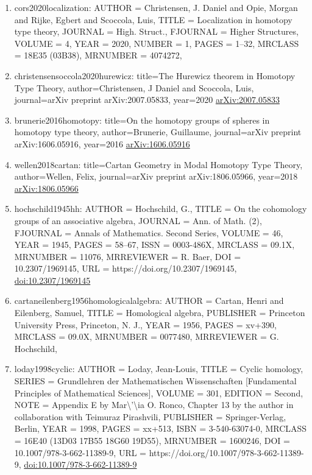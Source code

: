 \documentclass[11pt]{article}
\begin{document}
\begin{enumerate}[leftmargin=*]
  \item cors2020localization: AUTHOR = Christensen, J. Daniel and Opie, Morgan and Rijke, Egbert and Scoccola, Luis, TITLE = Localization in homotopy type theory, JOURNAL = High. Struct., FJOURNAL = Higher Structures, VOLUME = 4, YEAR = 2020, NUMBER = 1, PAGES = 1--32, MRCLASS = 18E35 (03B38), MRNUMBER = 4074272,
  \item christensensoccola2020hurewicz: title=The Hurewicz theorem in Homotopy Type Theory, author=Christensen, J Daniel and Scoccola, Luis, journal=arXiv preprint arXiv:2007.05833, year=2020 \href{https://arxiv.org/abs/2007.05833}{arXiv:2007.05833}
  \item brunerie2016homotopy: title=On the homotopy groups of spheres in homotopy type theory, author=Brunerie, Guillaume, journal=arXiv preprint arXiv:1606.05916, year=2016 \href{https://arxiv.org/abs/1606.05916}{arXiv:1606.05916}
  \item wellen2018cartan: title=Cartan Geometry in Modal Homotopy Type Theory, author=Wellen, Felix, journal=arXiv preprint arXiv:1806.05966, year=2018 \href{https://arxiv.org/abs/1806.05966}{arXiv:1806.05966}
  \item hochschild1945hh: AUTHOR = Hochschild, G., TITLE = On the cohomology groups of an associative algebra, JOURNAL = Ann. of Math. (2), FJOURNAL = Annals of Mathematics. Second Series, VOLUME = 46, YEAR = 1945, PAGES = 58--67, ISSN = 0003-486X, MRCLASS = 09.1X, MRNUMBER = 11076, MRREVIEWER = R. Baer, DOI = 10.2307/1969145, URL = https://doi.org/10.2307/1969145, \href{https://doi.org/10.2307/1969145}{doi:10.2307/1969145}
  \item cartaneilenberg1956homologicalalgebra: AUTHOR = Cartan, Henri and Eilenberg, Samuel, TITLE = Homological algebra, PUBLISHER = Princeton University Press, Princeton, N. J., YEAR = 1956, PAGES = xv+390, MRCLASS = 09.0X, MRNUMBER = 0077480, MRREVIEWER = G. Hochschild,
  \item loday1998cyclic: AUTHOR = Loday, Jean-Louis, TITLE = Cyclic homology, SERIES = Grundlehren der Mathematischen Wissenschaften [Fundamental Principles of Mathematical Sciences], VOLUME = 301, EDITION = Second, NOTE = Appendix E by Mar\textbackslash{}'\textbackslash{}ia O. Ronco, Chapter 13 by the author in collaboration with Teimuraz Pirashvili, PUBLISHER = Springer-Verlag, Berlin, YEAR = 1998, PAGES = xx+513, ISBN = 3-540-63074-0, MRCLASS = 16E40 (13D03 17B55 18G60 19D55), MRNUMBER = 1600246, DOI = 10.1007/978-3-662-11389-9, URL = https://doi.org/10.1007/978-3-662-11389-9, \href{https://doi.org/10.1007/978-3-662-11389-9}{doi:10.1007/978-3-662-11389-9}

\end{enumerate}
\end{document}
